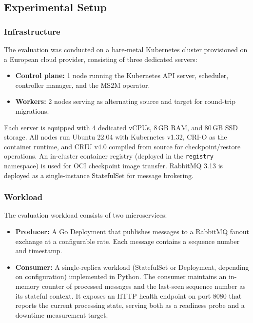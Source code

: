 \documentclass[conference]{IEEEtran}
\begin{document}
\subsection{Experimental Setup}
\label{sec:setup}

\subsubsection{Infrastructure}

The evaluation was conducted on a bare-metal Kubernetes cluster provisioned on
a European cloud provider, consisting of three dedicated servers:

\begin{itemize}
\item \textbf{Control plane:} 1 node running the Kubernetes API server,
  scheduler, controller manager, and the MS2M operator.
\item \textbf{Workers:} 2 nodes serving as alternating source and target for
  round-trip migrations.
\end{itemize}

Each server is equipped with 4 dedicated vCPUs, 8\,GB RAM, and 80\,GB SSD
storage. All nodes run Ubuntu 22.04 with Kubernetes v1.32, CRI-O as the
container runtime, and CRIU v4.0 compiled from source for checkpoint/restore
operations. An in-cluster container registry (deployed in the \texttt{registry}
namespace) is used for OCI checkpoint image transfer. RabbitMQ 3.13 is deployed
as a single-instance StatefulSet for message brokering.

\subsubsection{Workload}

The evaluation workload consists of two microservices:

\begin{itemize}
\item \textbf{Producer:} A Go Deployment that publishes messages to a RabbitMQ
  fanout exchange at a configurable rate. Each message contains a sequence
  number and timestamp.
\item \textbf{Consumer:} A single-replica workload (StatefulSet or Deployment,
  depending on configuration) implemented in Python. The consumer maintains an
  in-memory counter of processed messages and the last-seen sequence number as
  its stateful context. It exposes an HTTP health endpoint on port 8080 that
  reports the current processing state, serving both as a readiness probe and
  a downtime measurement target.
\end{itemize}
\end{document}
